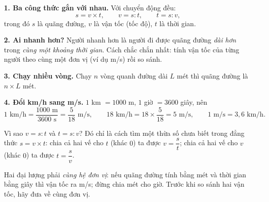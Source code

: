 \begin{knowbox}
\textbf{1. Ba công thức gắn với nhau.} Với chuyển động đều:
\[ s = v \times t, \qquad v = s : t, \qquad t = s : v, \]
trong đó $s$ là quãng đường, $v$ là vận tốc (tốc độ), $t$ là thời gian.

\textbf{2. Ai nhanh hơn?} Người nhanh hơn là người đi được quãng đường \emph{dài hơn} trong \emph{cùng một khoảng thời
gian}. Cách chắc chắn nhất: tính vận tốc của từng người theo cùng một đơn vị (ví dụ m/s) rồi so sánh.

\textbf{3. Chạy nhiều vòng.} Chạy $n$ vòng quanh đường dài $L$ mét thì quãng đường là $n \times L$ mét.

\textbf{4. Đổi km/h sang m/s.} $1$ km $= 1000$ m, $1$ giờ $= 3600$ giây, nên
\[ 1 \text{ km/h} = \frac{1000 \text{ m}}{3600 \text{ s}} = \frac{5}{18} \text{ m/s}, \qquad
   18 \text{ km/h} = 18\times\frac{5}{18} = 5 \text{ m/s}, \qquad 1 \text{ m/s} = 3{,}6 \text{ km/h}. \]
\end{knowbox}
\begin{proofbox}
Vì sao $v = s : t$ và $t = s : v$? Đó chỉ là cách tìm một thừa số chưa biết trong đẳng thức $s = v\times t$:
chia cả hai vế cho $t$ (khác $0$) ta được $v = \dfrac{s}{t}$; chia cả hai vế cho $v$ (khác $0$) ta được $t = \dfrac{s}{v}$.
\end{proofbox}
\begin{warnbox}
Hai đại lượng phải \emph{cùng hệ đơn vị}: nếu quãng đường tính bằng mét và thời gian bằng giây thì vận tốc ra m/s;
đừng chia mét cho giờ. Trước khi so sánh hai vận tốc, hãy đưa về cùng đơn vị.
\end{warnbox}


